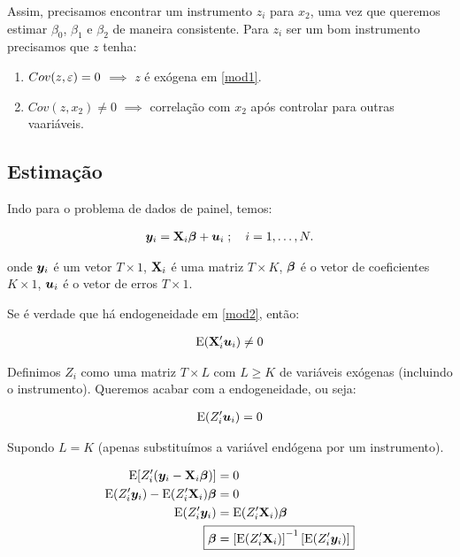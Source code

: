\documentclass[11pt, oneside, a4paper, article]{article}
\numberwithin{equation}{section}
\begin{document}
\begin{description}
	Assim, precisamos encontrar um instrumento $z_{i}$ para $x_{2}$, uma vez que queremos estimar $\beta_{0}$, $\beta_{1}$ e $\beta_{2}$ de maneira consistente.
	Para $z_{i}$ ser um bom instrumento precisamos que $z$ tenha:

	\begin{enumerate}\itemsep0pt
		\item $Cov(z, \varepsilon) = 0$ $\implies$  $z$ é exógena em \eqref{mod1}.
		\item $Cov(z, x_{2}) \neq 0$ $\implies$  correlação com $x_{2}$ após controlar para outras vaariáveis.
	\end{enumerate}

	\subsection{Estimação}

	Indo para o problema de dados de painel, temos:

	\vspace{-1 em}
	\begin{align} \label{mod2}
		\boldsymbol{y}_{i} = \mathbf{X}_{i} \boldsymbol{\beta} + \boldsymbol{u}_{i}
		\; ; \quad i = 1, \dots, N.
	\end{align}

	\noindent
	onde 
	$\boldsymbol{y}_{i}$ é um vetor $T \times 1$,
	$\mathbf{X}_{i}$ é uma matriz $T \times K$,
	$\boldsymbol{\beta}$ é o vetor de coeficientes $K \times 1$,
	$\boldsymbol{u}_{i}$ é o vetor de erros $T \times 1$.

	Se é verdade que há endogeneidade em \eqref{mod2}, então:

	\vspace{-1 em}
	\begin{align*}
		\text{E}(\mathbf{X}_{i}^{\prime} \boldsymbol{u}_{i}) \neq 0
	\end{align*}

	Definimos $Z_{i}$ como uma matriz $T \times L$ com $L \geq K$ de variáveis exógenas (incluindo o instrumento).
	Queremos acabar com a endogeneidade, ou seja:

	\vspace{-1 em}
	\begin{align*}
		\text{E}(Z_{i}^{\prime} \boldsymbol{u}_{i}) = 0
	\end{align*}

	Supondo $L = K$ (apenas substituímos a variável endógena por um instrumento).

	\vspace{-1 em}
	\begin{align*}
		\E[ Z_{i}^{\prime} ( \yvec_{i} - \Xmat_{i} \betavec ) ] &= 0
		\\
		\E( Z_{i}^{\prime} \yvec_{i} ) - \E( Z_{i}^{\prime} \Xmat_{i} ) \betavec &= 0
		\\
		\E( Z_{i}^{\prime} \yvec_{i} ) &= \E( Z_{i}^{\prime} \Xmat_{i} ) \betavec
		\\
		\Aboxed{
			\betavec &=
			\left[ \E( Z_{i}^{\prime} \Xmat_{i} ) \right]^{-1}
			\left[ \E( Z_{i}^{\prime} \yvec_{i} ) \right]
		}
	\end{align*}


\end{description}
\end{document}
